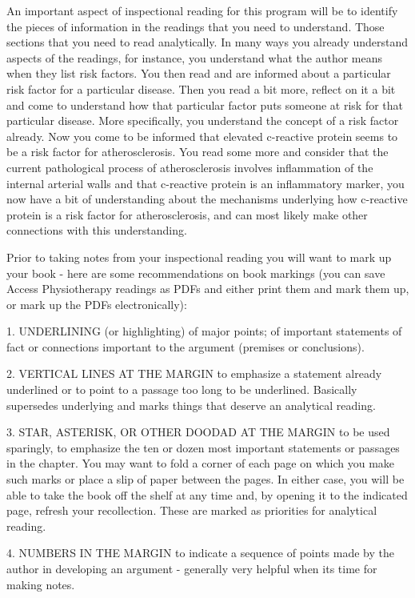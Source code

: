 An important aspect of inspectional reading for this program will be to identify the pieces of information in the readings that you need to understand. Those sections that you need to read analytically. In many ways you already understand aspects of the readings, for instance, you understand what the author means when they list risk factors. You then read and are informed about a particular risk factor for a particular disease. Then you read a bit more, reflect on it a bit and come to understand how that particular factor puts someone at risk for that particular disease. More specifically, you understand the concept of a risk factor already. Now you come to be informed that elevated c-reactive protein seems to be a risk factor for atherosclerosis. You read some more and consider that the current pathological process of atherosclerosis involves inflammation of the internal arterial walls and that c-reactive protein is an inflammatory marker, you now have a bit of understanding about the mechanisms underlying how c-reactive protein is a risk factor for atherosclerosis, and can most likely make other connections with this understanding.

Prior to taking notes from your inspectional reading you will want to mark up your book - here are some recommendations on book markings (you can save Access Physiotherapy readings as PDFs and either print them and mark them up, or mark up the PDFs electronically):

1. UNDERLINING (or highlighting) of major points; of important statements of fact or connections important to the argument (premises or conclusions).

2. VERTICAL LINES AT THE MARGIN to emphasize a statement already underlined or to point to a passage too long to be underlined. Basically supersedes underlying and marks things that deserve an analytical reading.

3. STAR, ASTERISK, OR OTHER DOODAD AT THE MARGIN to be used sparingly, to emphasize the ten or dozen most important statements or passages in the chapter. You may want to fold a corner of each page on which you make such marks or place a slip of paper between the pages. In either case, you will be able to take the book off the shelf at any time and, by opening it to the indicated page, refresh your recollection. These are marked as priorities for analytical reading.

4. NUMBERS IN THE MARGIN to indicate a sequence of points made by the author in developing an argument - generally very helpful when its time for making notes.

